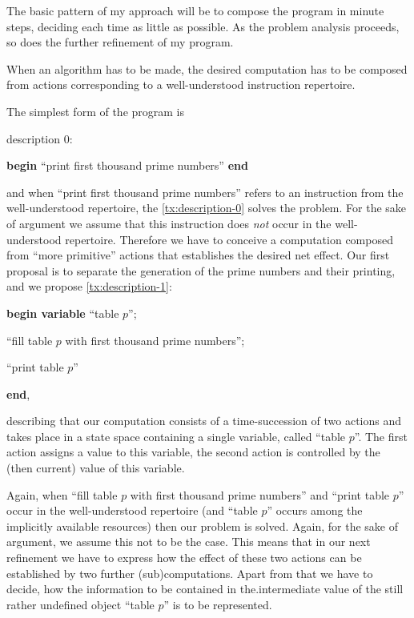 The basic pattern of my approach will be to compose the program in minute steps, deciding each time as little as possible. As the problem analysis proceeds, so does the further refinement of my program.

When an algorithm has to be made, the desired computation has to be composed from actions corresponding to a well-understood instruction repertoire.

The simplest form of the program is
\medskip


\noindent
description 0:

\textbf{begin} ``print first thousand prime numbers'' \textbf{end}

\noindent
and when ``print first thousand prime numbers'' refers to an instruction from the well-understood repertoire, the \ref{tx:description-0} solves the problem. For the sake of argument we assume that this instruction does \textit{not} occur in the well-understood repertoire. Therefore we have to conceive a computation composed from ``more primitive'' actions that establishes the desired net effect. Our first proposal is to separate the generation of the prime numbers and their printing, and we propose \ref{tx:description-1}:
\medskip

\textbf{begin variable} ``table $p$'';

\quad ``fill table $p$ with first thousand prime numbers'';

\quad ``print table $p$''

\textbf{end},

\noindent
describing that our computation consists of a time-succession of two actions and takes place in a state space containing a single variable, called ``table $p$''. The first action assigns a value to this variable, the second action is controlled by the (then current) value of this variable.

Again, when ``fill table $p$ with first thousand prime numbers'' and ``print table $p$'' occur in the well-understood repertoire (and ``table $p$'' occurs among the implicitly available resources) then our problem is solved. Again, for the sake of argument, we assume this not to be the case. This means that in our next refinement we have to express how the effect of these two actions can be established by two further (sub)computations. Apart from that we have to decide, how the information to be contained in the.intermediate value of the still rather undefined object ``table $p$'' is to be represented.

